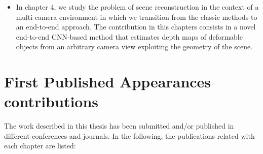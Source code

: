 \begin{itemize}
    \item In chapter 4, we study the problem of scene reconstruction in the context of a multi-camera environment in which we transition from the classic methods to an end-to-end approach. The contribution in this chapters consists in a novel end-to-end CNN-based method that estimates depth maps of deformable objects from an arbitrary camera view exploiting the geometry of the scene.
    
\end{itemize}

\newpage
\section{First Published Appearances contributions}

The work described in this thesis has been submitted and/or published in different conferences and journals. In the following, the publications related with each chapter are listed:

